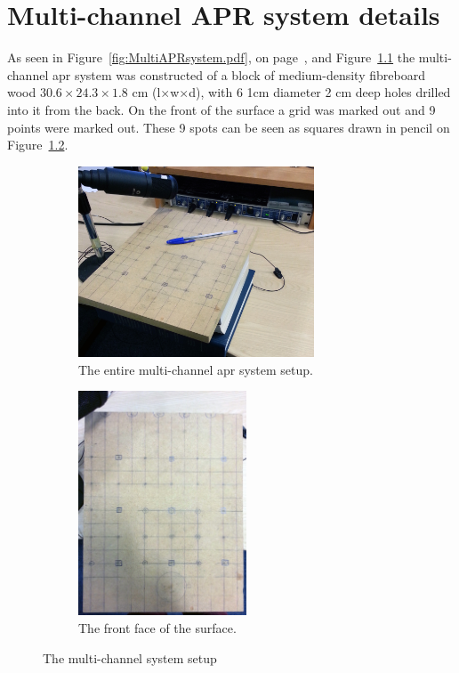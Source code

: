\chapter{Multi-channel APR system details}\label{ap:MultiAPRsystem}

\ifpdf
    \graphicspath{{Appendices/AppendixMultiAPRsystem/Photos/}{Appendices/AppendixMultiAPRsystem/Figs/}}
\else
\fi

As seen in Figure~\ref{fig:MultiAPRsystem.pdf}, on page~\pageref{fig:MultiAPRsystem.pdf}, and Figure~\ref{fig:wholesystem} the multi-channel \gls{apr} system was constructed of a block of medium-density fibreboard wood $30.6 \times 24.3 \times 1.8$ cm (l$\times$w$\times$d), with 6 1cm diameter 2 cm deep holes drilled into it from the back. On the front of the surface a grid was marked out and 9 points were marked out. These 9 spots can be seen as squares drawn in pencil on Figure~\ref{fig:frontfacesurface}.
\begin{figure}[b!]
\centering
\begin{subfigure}{.5\textwidth}
  \centering
  \includegraphics[width=7cm]{wholesystem}
  \caption{The entire multi-channel \gls{apr} system setup.}
  \label{fig:wholesystem}
\end{subfigure}%
\begin{subfigure}{.5\textwidth}
  \centering
  \includegraphics[width=5cm]{surface}
  \caption{The front face of the surface.}
  \label{fig:frontfacesurface}
\end{subfigure}
\caption{The multi-channel system setup}
\label{fig:multiAPRsystemwhole}
\end{figure}

